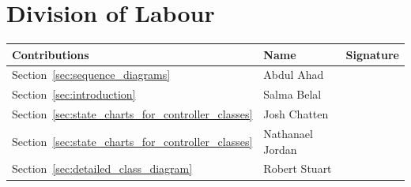 \documentclass[titlepage,12pt]{article}
\begin{document}

\appendix
\section{Division of Labour}
\label{sec:division_of_labour}

\begin{table}[H]
\vspace{-0.06in}
\begin{center}
\setlength{\extrarowheight}{4.0pt}
\begin{tabular}{m{} m{} m{}} 
\hline
\textbf{Contributions} & \textbf{Name} & \textbf{Signature}\\
\hline
Section~\ref{sec:sequence_diagrams} & Abdul Ahad & \\
\hline
Section~\ref{sec:introduction} & Salma Belal & \\
\hline
Section~\ref{sec:state_charts_for_controller_classes} & Josh Chatten & \\
\hline
Section~\ref{sec:state_charts_for_controller_classes} & Nathanael Jordan  & \\
\hline
Section~\ref{sec:detailed_class_diagram} & Robert Stuart & \\
\hline
\end{tabular}
\end{center}
\label{divOfLabour}
\end{table}

\end{document}
